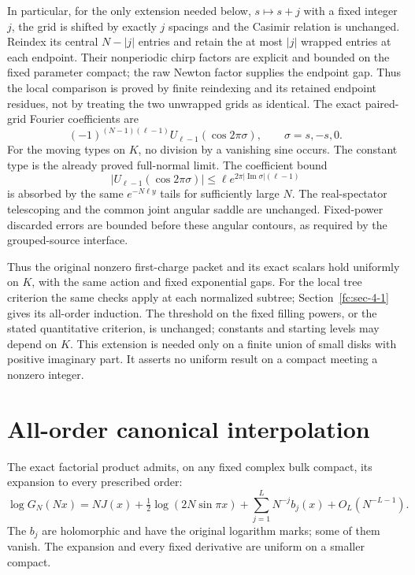 In particular, for the only extension needed below, \(s\mapsto s+j\) with a fixed integer \(j\), the grid is shifted by exactly \(j\) spacings and the Casimir relation is unchanged. Reindex its central \(N-|j|\) entries and retain the at most \(|j|\) wrapped entries at each endpoint. Their nonperiodic chirp factors are explicit and bounded on the fixed parameter compact; the raw Newton factor supplies the endpoint gap. Thus the local comparison is proved by finite reindexing and its retained endpoint residues, not by treating the two unwrapped grids as identical. The exact paired-grid Fourier coefficients are
\begin{equation}\label{fc:eq-7}
(-1)^{(N-1)(\ell-1)}U_{\ell-1}(\cos2\pi\sigma),
 \qquad \sigma=s,-s,0.
\end{equation}
 For the moving types on \(K\), no division by a vanishing sine occurs. The constant type is the already proved full-normal limit. The coefficient bound
\begin{equation}\label{fc:eq-8}
|U_{\ell-1}(\cos2\pi\sigma)|
       \le \ell e^{2\pi |\operatorname{Im}\sigma|(\ell-1)}
\end{equation}
 is absorbed by the same \(e^{-N\ell y}\) tails for sufficiently large \(N\). The real-spectator telescoping and the common joint angular saddle are unchanged. Fixed-power discarded errors are bounded before these angular contours, as required by the grouped-source interface.

Thus the original nonzero first-charge packet and its exact scalars hold uniformly on \(K\), with the same action and fixed exponential gaps. For the local tree criterion the same checks apply at each normalized subtree; Section~\ref{fc:sec-4-1} gives its all-order induction. The threshold on the fixed filling powers, or the stated quantitative criterion, is unchanged; constants and starting levels may depend on \(K\). This extension is needed only on a finite union of small disks with positive imaginary part. It asserts no uniform result on a compact meeting a nonzero integer.

\section{All-order canonical interpolation}\label{fc:sec-3}

The exact factorial product admits, on any fixed complex bulk compact, its expansion to every prescribed order:
\begin{equation}\label{fc:eq-9}
\log G_N(Nx)=N J(x)+\tfrac12\log(2N\sin\pi x)
            +\sum_{j=1}^{L}N^{-j}b_j(x)+O_L(N^{-L-1}).
\end{equation}
 The \(b_j\) are holomorphic and have the original logarithm marks; some of them vanish. The expansion and every fixed derivative are uniform on a smaller compact.


